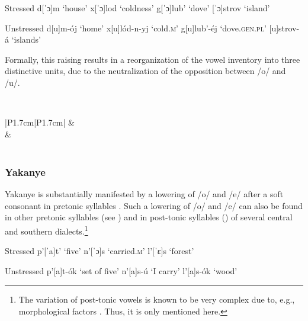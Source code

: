 \documentclass[output=paper,modfonts,newtxmath,hidelinks,]{langscibook}
\begin{document}
\ea\label{5:13}\begin{multicols}{2}
\begin{xlist}
\exi{} {Stressed}
\ex d[ˈɔ]m \tabto{2.1cm}‘house’\label{5:13a}
\exi{} x[ˈɔ]lod \tabto{2.1cm}‘coldness’
\ex g[ˈɔ]lub’ \tabto{2.1cm}‘dove’\label{5:13b}
\exi{} {[ˈɔ]strov} \tabto{2.1cm}‘island’
\end{xlist}\columnbreak
\begin{xlist}
\exi{} {Unstressed}
\exi{} d[u]m-ój \tabto{2.1cm}‘home’
\exi{} x[u]lód-n-yj \tabto{2.1cm}‘cold.\textsc{m}’
\exi{} g[u]lub’-éj \tabto{2.1cm}‘dove.\textsc{gen.pl}’
\exi{} {[u]strov-á} \tabto{2.1cm}‘islands’
\end{xlist}
\end{multicols}
\z

\noindent Formally, this raising results in a reorganization of the vowel inventory into three distinctive units, due to the neutralization of the opposition between /o/ and /u/.

\label{5:14}\\\medskip
\begin{tabular}{|P{1.7cm}|P{1.7cm}|}
\hline
[ɨ]&\\\hhline{-~}
\shadecell{}&\\\hline
{}\\\hline
\end{tabular}
\z


\subsubsection{Yakanye}\label{5:s2.3.2}

Yakanye is substantially manifested by a lowering of /o/ and /e/ after a soft consonant in pretonic syllables . Such a lowering of /o/ and /e/ can also be found in other pretonic syllables (see \citealt[§96]{Avanesov1949}) and in post-tonic syllables (\citealt[§108--112]{Avanesov1949}) of several central and southern dialects.\footnote{The variation of post-tonic vowels is known to be very complex due to, e.g., morphological factors \citep[§107]{Avanesov1949}. Thus, it is only mentioned here.}\vspace{-\baselineskip}

\ea\label{5:15}\begin{multicols}{2}
\begin{xlist}
\exi{} {Stressed}
\exi{} p’[ˈa]t’ \tabto{2.1cm}‘five’
\exi{} n’[ˈɔ]s \tabto{2.1cm}‘carried.\textsc{m}’
\exi{} l’[ˈɛ]s \tabto{2.1cm}‘forest’
\end{xlist}\columnbreak
\begin{xlist}
\exi{} {Unstressed}
\exi{} p’[a]t-ók \tabto{2.1cm}‘set of five’
\exi{} n’[a]s-ú \tabto{2.1cm}‘I carry’
\exi{} l’[a]s-ók \tabto{2.1cm}‘wood’
\end{xlist}
\end{multicols}
\z
\end{document}
